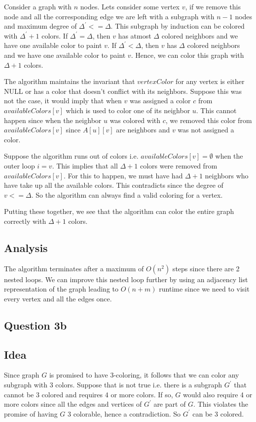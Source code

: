 \documentclass{article}
\begin{document}
Consider a graph with $n$ nodes. Lets consider some vertex $v$, if we remove this node and all the corresponding edge we are left with a subgraph with $n-1$ nodes and maximum degree of $\Delta^\prime <= \Delta$. This subgraph by induction can be colored with $\Delta^\prime+1$ colors. If $\Delta^\prime = \Delta$, then $v$ has atmost $\Delta$ colored neighbors and we have one available color to paint $v$. If $\Delta^\prime < \Delta$, then $v$ has $\Delta$ colored neighbors and we have one available color to paint $v$. Hence, we can color this graph with $\Delta+1$ colors.

The algorithm maintains the invariant that $vertexColor$ for any vertex is either NULL or has a color that doesn't conflict with its neighbors. Suppose this was not the case, it would imply that when $v$ was assigned a color $c$ from $availableColors[v]$ which is used to color one of its neighbor $u$. This cannot happen since when the neighbor $u$ was colored with $c$, we removed this color from $availableColors[v]$ since $A[u][v]$ are neighbors and $v$ was not assigned a color.

Suppose the algorithm runs out of colors i.e. $availableColors[v] = \emptyset$ when the outer loop $i=v$. This implies that all $\Delta+1$ colors were removed from $availableColors[v]$. For this to happen, we must have had $\Delta+1$ neighbors who have take up all the available colors. This contradicts since the  degree of $v <= \Delta$. So the algorithm can always find a valid coloring for a vertex.

Putting these together, we see that the algorithm can color the entire graph correctly with $\Delta+1$ colors.

\subsection*{Analysis}
The algorithm terminates after a maximum of $O(n^2)$ steps since there are 2 nested loops. We can improve this nested loop further by using an adjacency list representation of the graph leading to $O(n+m)$ runtime since we need to visit every vertex and all the edges once.

\subsection*{Question 3b}

\subsection*{Idea}
Since graph $G$ is promised to have 3-coloring, it follows that we can color any subgraph with 3 colors. Suppose that is not true i.e. there is a subgraph $G^\prime$ that cannot be 3 colored and requires 4 or more colors. If so, $G$ would also require 4 or more colors since all the edges and vertices of $G^\prime$ are part of $G$. This violates the promise of having $G$ 3 colorable, hence a contradiction. So $G^\prime$ can be 3 colored.
\end{document}
